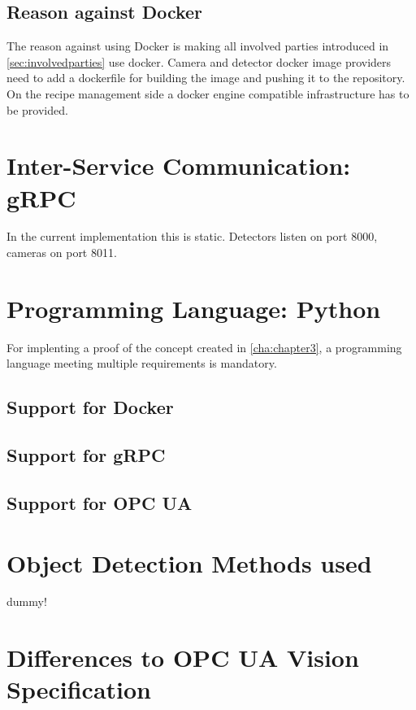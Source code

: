 \subsection{Reason against Docker}
The reason against using Docker is making all involved parties introduced in \ref{sec:involvedparties} use docker. Camera and detector docker image providers need to add a dockerfile for building the image and pushing it to the repository. On the recipe management side a docker engine compatible infrastructure has to be provided. 

\section{Inter-Service Communication: gRPC}
In the current implementation this is static. Detectors listen on port 8000, cameras on port 8011. 

\section{Programming Language: Python}
For implenting a proof of the concept created in \ref{cha:chapter3}, a programming language meeting multiple requirements is mandatory. 

\subsection{Support for Docker}


\subsection{Support for gRPC}

\subsection{Support for OPC UA}

\section{Object Detection Methods used}
dummy!

\section{Differences to OPC UA Vision Specification}